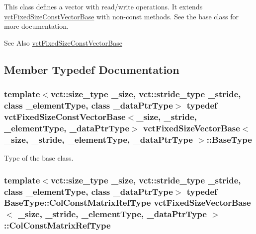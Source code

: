 This class defines a vector with read/write operations. It extends \hyperlink{classvct_fixed_size_const_vector_base}{vct\-Fixed\-Size\-Const\-Vector\-Base} with non-\/const methods. See the base class for more documentation.

\begin{DoxySeeAlso}{See Also}
\hyperlink{classvct_fixed_size_const_vector_base}{vct\-Fixed\-Size\-Const\-Vector\-Base} 
\end{DoxySeeAlso}


\subsection{Member Typedef Documentation}
\hypertarget{classvct_fixed_size_vector_base_a91288c3a362ee7685859f42a9a3667c4}{
\subsubsection[{Base\-Type}]{\setlength{\rightskip}{0pt plus 5cm}template$<$vct\-::size\-\_\-type \-\_\-size, vct\-::stride\-\_\-type \-\_\-stride, class \-\_\-element\-Type, class \-\_\-data\-Ptr\-Type$>$ typedef {\bf vct\-Fixed\-Size\-Const\-Vector\-Base}$<$\-\_\-size, \-\_\-stride, \-\_\-element\-Type, \-\_\-data\-Ptr\-Type$>$ {\bf vct\-Fixed\-Size\-Vector\-Base}$<$ \-\_\-size, \-\_\-stride, \-\_\-element\-Type, \-\_\-data\-Ptr\-Type $>$\-::{\bf Base\-Type}}}\label{classvct_fixed_size_vector_base_a91288c3a362ee7685859f42a9a3667c4}
Type of the base class. \hypertarget{classvct_fixed_size_vector_base_af2eb123c105381e108d3a94c3ba301b4}{
\subsubsection[{Col\-Const\-Matrix\-Ref\-Type}]{\setlength{\rightskip}{0pt plus 5cm}template$<$vct\-::size\-\_\-type \-\_\-size, vct\-::stride\-\_\-type \-\_\-stride, class \-\_\-element\-Type, class \-\_\-data\-Ptr\-Type$>$ typedef {\bf Base\-Type\-::\-Col\-Const\-Matrix\-Ref\-Type} {\bf vct\-Fixed\-Size\-Vector\-Base}$<$ \-\_\-size, \-\_\-stride, \-\_\-element\-Type, \-\_\-data\-Ptr\-Type $>$\-::{\bf Col\-Const\-Matrix\-Ref\-Type}}}\label{classvct_fixed_size_vector_base_af2eb123c105381e108d3a94c3ba301b4}
